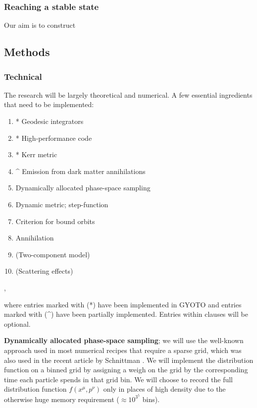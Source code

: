 \documentclass[a4paper,10pt]{article}
\begin{document}
\subsubsection{Reaching a stable state}

Our aim is to construct 


\subsection{Methods}


\subsubsection{Technical}

The research will be largely theoretical and numerical. A few essential ingredients that need to be implemented:

\begin{enumerate}
 \item * Geodesic integrators
 \item * High-performance code %
 \item * Kerr metric
 \item ^ Emission from dark matter annihilations
 \item Dynamically allocated phase-space sampling
 \item Dynamic metric; step-function
 \item Criterion for bound orbits
 \item Annihilation
 \item (Two-component model)
 \item (Scattering effects)
\end{enumerate},

where entries marked with (*) have been implemented in GYOTO \citep{gyoto_vincent_2011} and entries marked with (^) have been partially implemented. 
Entries within clauses will be optional.

\textbf{Dynamically allocated phase-space sampling}; we will use the well-known approach used in most numerical recipes that require 
a sparse grid, which was also used in the recent article by Schnittman \citep{schnittman2015}. %
We will implement the distribution function on a binned grid by assigning a weigh on the grid by the corresponding time each particle spends in 
that grid bin. We will choose to record the full distribution function $f(x^\mu,p^\nu)$ only in places of high density due to the otherwise 
huge memory requirement ($\approx 10^3^5$ bins).
\end{document}
